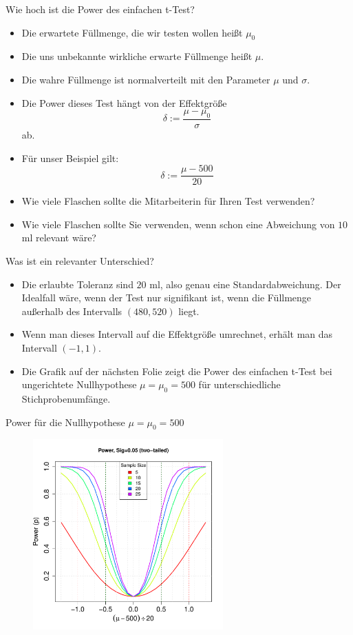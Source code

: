 \documentclass[usenames,dvipsnames,handout]{beamer}
\begin{document}
\begin{frame}{Wie hoch ist die Power des einfachen t-Test?}
\begin{itemize}
\item{Die erwartete  Füllmenge, die wir testen wollen heißt $\mu_{0}$}\pause
\item{Die uns unbekannte wirkliche erwarte Füllmenge heißt $\mu.$}\pause
\item{Die wahre Füllmenge ist normalverteilt mit den Parameter $\mu$ und $\sigma.$}\pause
\item{Die Power dieses Test hängt von der Effektgröße $$\delta:=\frac{\mu-\mu_{0}}{\sigma}$$ ab.}\pause
\item{Für unser Beispiel gilt: $$\delta:=\frac{\mu-500}{20}$$}\pause
\item{Wie viele Flaschen sollte die Mitarbeiterin für Ihren Test verwenden?}\pause
\item{Wie viele Flaschen sollte Sie verwenden, wenn schon eine Abweichung von $10$ ml relevant wäre?}
\end{itemize}
\end{frame}

\begin{frame}{Was ist ein relevanter Unterschied?}
\begin{itemize}
\item{Die erlaubte Toleranz sind $20$ ml, also genau eine Standardabweichung.
Der Idealfall wäre, wenn der Test nur signifikant ist, wenn die Füllmenge
außerhalb des Intervalls $(480,520)$ liegt.}\pause
\item{Wenn man dieses Intervall auf die Effektgröße umrechnet, erhält man 
das Intervall $(-1,1).$}
\item{Die Grafik auf der nächsten Folie zeigt die Power des einfachen t-Test bei ungerichtete Nullhypothese $\mu=\mu_{0}=500$
für unterschiedliche Stichprobenumfänge.}
\end{itemize}
\end{frame}

\begin{frame}{Power für die Nullhypothese $\mu=\mu_{0}=500$}
  \begin{figure}[ht]
 	\centering
 	      \includegraphics[width=0.65\textwidth]{power3.pdf}%
 	\end{figure}
\end{frame}
\end{document}
